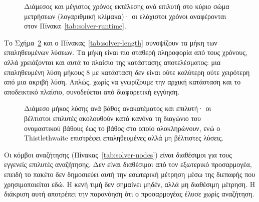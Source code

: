 \begin{figure}[htbp]\centering

\caption[Διάμεσος και μέγιστος χρόνος εκτέλεσης ανά επιλυτή]{Διάμεσος και μέγιστος χρόνος εκτέλεσης ανά επιλυτή στο κύριο σώμα μετρήσεων (λογαριθμική κλίμακα)· οι ελάχιστοι χρόνοι αναφέρονται στον Πίνακα~\ref{tab:solver-runtime}.}
\label{fig:runtime-by-solver}
\end{figure}

\begin{table}[htbp]\centering

\caption[Χρόνοι εκτέλεσης ανά επιλυτή]{Ελάχιστος, διάμεσος και μέγιστος χρόνος εκτέλεσης ανά επιλυτή στο κύριο σώμα μετρήσεων. Πηγή: .}
\label{tab:solver-runtime}
\end{table}

Το Σχήμα~\ref{fig:solution-length-depth} και ο Πίνακας~\ref{tab:solver-length} συνοψίζουν τα μήκη των επαληθευμένων λύσεων. Τα μήκη είναι πιο σταθερή πληροφορία από τους χρόνους, αλλά χρειάζονται και αυτά το πλαίσιο της κατάστασης αποτελέσματος: μια επαληθευμένη λύση μήκους 8 με κατάσταση  δεν είναι ούτε καλύτερη ούτε χειρότερη από μια ακριβή λύση. Απλώς, χωρίς να γνωρίζουμε την αρχική κατάσταση και το αποδεικτικό πλαίσιο, συνοδεύεται από διαφορετική εγγύηση.

\begin{figure}[htbp]\centering

\caption[Διάμεσο μήκος λύσης ανά βάθος ανακατέματος και επιλυτή]{Διάμεσο μήκος λύσης ανά βάθος ανακατέματος και επιλυτή· οι βέλτιστοι επιλυτές ακολουθούν κατά κανόνα τη διαγώνιο του ονομαστικού βάθους έως το βάθος στο οποίο ολοκληρώνουν, ενώ ο Thistlethwaite επιστρέφει επαληθευμένες αλλά μη βέλτιστες λύσεις.}
\label{fig:solution-length-depth}
\end{figure}

\begin{table}[htbp]\centering

\caption[Μήκη επαληθευμένων λύσεων ανά επιλυτή]{Πλήθος επαληθευμένων λύσεων και ελάχιστο, διάμεσο και μέγιστο μήκος λύσης ανά επιλυτή. Πηγή: .}
\label{tab:solver-length}
\end{table}

Οι κόμβοι αναζήτησης (Πίνακας~\ref{tab:solver-nodes}) είναι διαθέσιμοι για τους εγγενείς επιλυτές αναζήτησης. Δεν είναι διαθέσιμοι από τον εξωτερικό προσαρμογέα, επειδή το πακέτο δεν δημοσιεύει αυτή την εσωτερική μέτρηση μέσω της διεπαφής που χρησιμοποιείται εδώ. Η κενή τιμή δεν σημαίνει μηδέν, αλλά μη διαθέσιμη μέτρηση. Η διάκριση αυτή αποτρέπει την παρανόηση ότι ο προσαρμογέας έλυσε χωρίς αναζήτηση.

